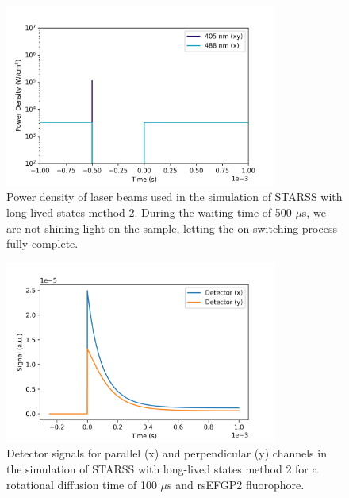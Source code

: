 \documentclass{article}
\begin{document}
\begin{figure}[h!]
    \centering
    \includegraphics[width=0.8\textwidth]
    {figures/starss2_pulse_scheme.png}
    \caption[Power density used in the simulation of STARSS method 2]
    {Power density of laser beams used in the simulation of STARSS with long-lived states method 2. During the waiting time of 500 $\mu$s, we are not shining light on the sample, letting the on-switching process fully complete.}
    \label{fig:starss2_pulse_scheme}
\end{figure}

\begin{figure}[h!]
    \centering
    \includegraphics[width=0.8\textwidth]
    {figures/starss2_signal.png}
    \caption[Simulated detector signals of STARSS method 2]
    {Detector signals for parallel (x) and perpendicular (y) channels in the simulation of STARSS with long-lived states method 2 for a rotational diffusion time of 100 $\mu$s and rsEFGP2 fluorophore.}
    \label{fig:starss2_signal}
\end{figure}
\end{document}

